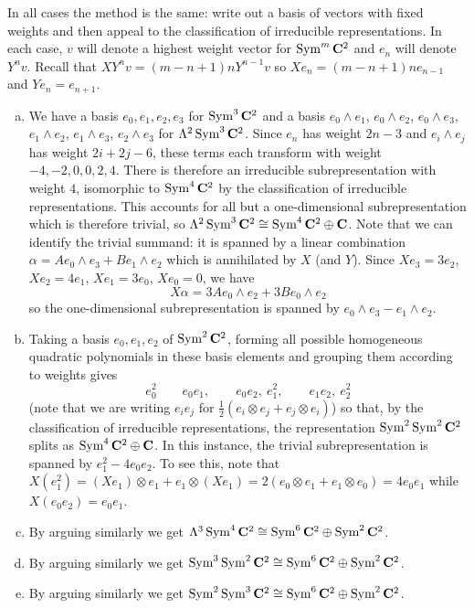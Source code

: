 \documentclass[12pt]{article}
\begin{document}
\iffalse
\begin{answer}
In all cases the method is the same: write out a basis of vectors with fixed weights and then appeal to the classification of irreducible representations. In each case, $v$ will denote a highest weight vector for $\operatorname{Sym}^m\mathbf{C}^2$ and $e_n$ will denote $Y^nv$. Recall that $XY^nv=(m-n+1)nY^{n-1}v$ so $Xe_n=(m-n+1)ne_{n-1}$ and $Ye_n=e_{n+1}$.
\begin{enumerate}[(a)]
\item We have a basis $e_0,e_1,e_2,e_3$ for $\operatorname{Sym}^3\mathbf{C}^2$ and a basis $e_0\wedge e_1$, $e_0\wedge e_2$, $e_0\wedge e_3$, $e_1\wedge e_2$, $e_1\wedge e_3$, $e_2\wedge e_3$ for $\Lambda^2\operatorname{Sym}^3\mathbf{C}^2$. Since $e_n$ has weight $2n-3$ and $e_i\wedge e_j$ has weight $2i+2j-6$, these terms each transform with weight $-4,-2,0,0,2,4$. There is therefore an irreducible subrepresentation with weight $4$, isomorphic to $\operatorname{Sym}^4\mathbf{C}^2$ by the classification of irreducible representations. This accounts for all but a one-dimensional subrepresentation which is therefore trivial, so $\Lambda^2\operatorname{Sym}^3\mathbf{C}^2\cong\operatorname{Sym}^4\mathbf{C}^2\oplus\mathbf{C}$. Note that we can identify the trivial summand: it is spanned by a linear combination $\alpha=Ae_0\wedge e_3+Be_1\wedge e_2$ which is annihilated by $X$ (and $Y$). Since $Xe_3=3e_2$, $Xe_2=4e_1$, $Xe_1=3e_0$, $Xe_0=0$, we have
\[X\alpha=3Ae_0\wedge e_2+3Be_0\wedge e_2\]
so the one-dimensional subrepresentation is spanned by $e_0\wedge e_{3}-e_{1}\wedge e_2$.
\item Taking a basis $e_0,e_1,e_2$ of $\operatorname{Sym}^2\mathbf{C}^2$, forming all possible homogeneous quadratic polynomials in these basis elements and grouping them according to weights gives
\[e_0^2\qquad e_0e_1,\qquad e_0e_2,\ e_1^2,\qquad e_1e_2,\ e_2^2\]
(note that we are writing $e_ie_j$ for $\frac{1}{2}(e_i\otimes e_j+e_j\otimes e_i)$) so that, by the classification of irreducible representations, the representation $\operatorname{Sym}^2\operatorname{Sym}^2\mathbf{C}^2$ splits as $\operatorname{Sym}^4\mathbf{C}^2\oplus\mathbf{C}$. In this instance, the trivial subrepresentation is spanned by $e_1^2-4e_0e_2$. To see this, note that $X(e_1^2)=(Xe_1)\otimes e_1+e_1\otimes(Xe_1)=2(e_0\otimes e_1+e_1\otimes e_0)=4e_0e_1$ while $X(e_0e_2)=e_0e_1$.
\item By arguing similarly we get $\Lambda^3\operatorname{Sym}^4\mathbf{C}^2\cong\operatorname{Sym}^6\mathbf{C}^2\oplus\operatorname{Sym}^2\mathbf{C}^2$.
\item By arguing similarly we get $\operatorname{Sym}^3\operatorname{Sym}^2\mathbf{C}^2\cong\operatorname{Sym}^6\mathbf{C}^2\oplus\operatorname{Sym}^2\mathbf{C}^2$.
\item By arguing similarly we get $\operatorname{Sym}^2\operatorname{Sym}^3\mathbf{C}^2\cong\operatorname{Sym}^6\mathbf{C}^2\oplus\operatorname{Sym}^2\mathbf{C}^2$.

\end{enumerate}
\end{answer}
\end{document}
